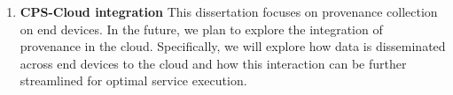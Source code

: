 \begin{enumerate}

\item\textbf{CPS-Cloud integration} This dissertation focuses on provenance collection on end devices. In the future, we plan to explore the integration of provenance in the cloud. Specifically, we will explore how data is disseminated across end devices to the cloud and how this interaction can be further streamlined for optimal service execution.

\end{enumerate}

